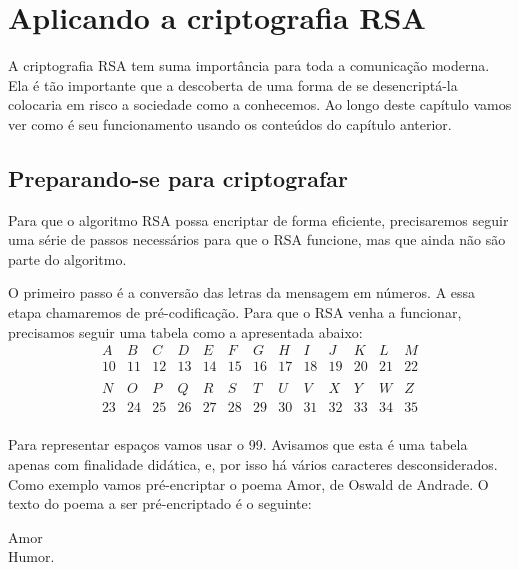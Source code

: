 \pagestyle{fancy}
\fancyhead[R]{\thepage}
\fancyfoot[C]{}
\chapter {Aplicando a criptografia RSA}
\label{RSA}

A criptografia RSA tem suma import\^ancia para toda a comunica\c{c}\~ao moderna. Ela \'e t\~ao importante que a descoberta de uma forma de se desencript\'a-la colocaria em risco a sociedade como a conhecemos. Ao longo deste cap\'itulo vamos ver como \'e seu funcionamento usando os conte\'udos do cap\'itulo anterior.

\section{Preparando-se para criptografar}

Para que o algoritmo RSA possa encriptar de forma eficiente, precisaremos seguir uma s\'erie de passos necess\'arios para que o RSA funcione, mas que ainda n\~ao s\~ao parte do algoritmo.

O primeiro passo \'e a convers\~ao das letras da mensagem em n\'umeros. A essa etapa chamaremos de pr\'e-codifica\c{c}\~ao. Para que o RSA venha a funcionar, precisamos seguir uma tabela como a apresentada abaixo:
\[
\begin{array}{ccccccccccccc}
A & B & C & D & E & F & G & H & I & J  &  K  & L  & M  \\ 
10 & 11 & 12 & 13 & 14 & 15 & 16 & 17 & 18 & 19 &  20 & 21 & 22 \\ 
\\
N & O  & P  & Q  & R  & S & T  & U  & V  & X  & Y  & W  & Z \\
23 & 24 & 25 & 26 & 27 & 28 & 29 & 30 & 31 & 32 & 33 & 34 & 35 \\
\end{array}
\]

Para representar espa\c{c}os vamos usar o 99. Avisamos que esta \'e uma tabela apenas com finalidade did\'atica, e, por isso h\'a v\'arios caracteres desconsiderados. Como exemplo vamos pr\'e-encriptar o poema Amor, de Oswald de Andrade. O texto do poema a ser pr\'e-encriptado \'e o seguinte:

\begin{center}
Amor  \\ 
Humor. \\ 
\end{center}

